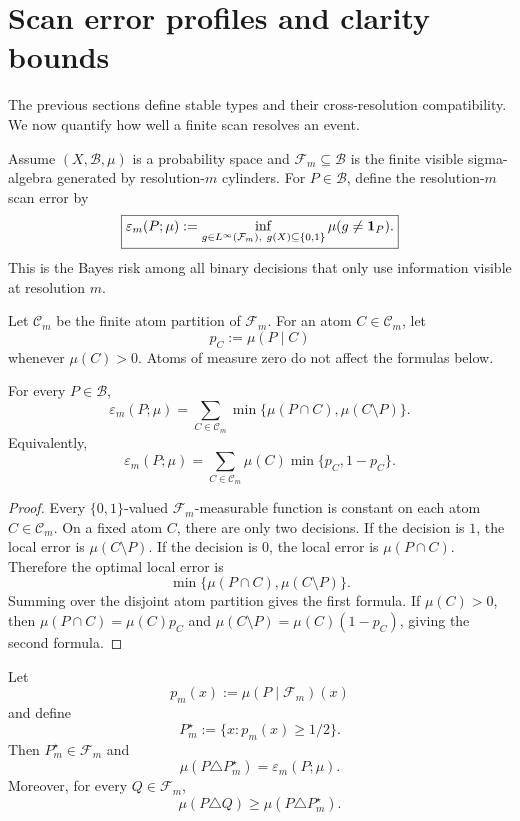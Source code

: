 \section{Scan error profiles and clarity bounds}
\label{sec:clarity}

The previous sections define stable types and their cross-resolution compatibility.  We now quantify how well a finite scan resolves an event.

Assume \((X,\mathcal B,\mu)\) is a probability space and \(\mathcal F_m\subseteq\mathcal B\) is the finite visible sigma-algebra generated by resolution-\(m\) cylinders.  For \(P\in\mathcal B\), define the resolution-\(m\) scan error by
\[
\boxed{
\varepsilon_m(P;\mu):=
\inf_{g\in L^\infty(\mathcal F_m),\ g(X)\subseteq\{0,1\}}
\mu(g\ne \mathbf{1}_P).
}
\]
This is the Bayes risk among all binary decisions that only use information visible at resolution \(m\).

Let \(\mathcal C_m\) be the finite atom partition of \(\mathcal F_m\).  For an atom \(C\in\mathcal C_m\), let
\[
p_C:=\mu(P\mid C)
\]
whenever \(\mu(C)>0\).  Atoms of measure zero do not affect the formulas below.

\begin{theorem}
\label{prop:cylinder-decomposition}
For every \(P\in\mathcal B\),
\[
\varepsilon_m(P;\mu)=
\sum_{C\in\mathcal C_m}
\min\{\mu(P\cap C),\mu(C\setminus P)\}.
\]
Equivalently,
\[
\varepsilon_m(P;\mu)=
\sum_{C\in\mathcal C_m}\mu(C)\min\{p_C,1-p_C\}.
\]
\end{theorem}

\begin{proof}
Every \(\{0,1\}\)-valued \(\mathcal F_m\)-measurable function is constant on each atom \(C\in\mathcal C_m\).  On a fixed atom \(C\), there are only two decisions.  If the decision is \(1\), the local error is \(\mu(C\setminus P)\).  If the decision is \(0\), the local error is \(\mu(P\cap C)\).  Therefore the optimal local error is
\[
\min\{\mu(P\cap C),\mu(C\setminus P)\}.
\]
Summing over the disjoint atom partition gives the first formula.  If \(\mu(C)>0\), then \(\mu(P\cap C)=\mu(C)p_C\) and \(\mu(C\setminus P)=\mu(C)(1-p_C)\), giving the second formula.
\end{proof}

\begin{theorem}
\label{thm:bayes-prefix-classifier}
Let
\[
p_m(x):=\mu(P\mid\mathcal F_m)(x)
\]
and define
\[
P_m^\star:=\{x:p_m(x)\ge 1/2\}.
\]
Then \(P_m^\star\in\mathcal F_m\) and
\[
\mu(P\triangle P_m^\star)=\varepsilon_m(P;\mu).
\]
Moreover, for every \(Q\in\mathcal F_m\),
\[
\mu(P\triangle Q)\ge \mu(P\triangle P_m^\star).
\]
\end{theorem}

